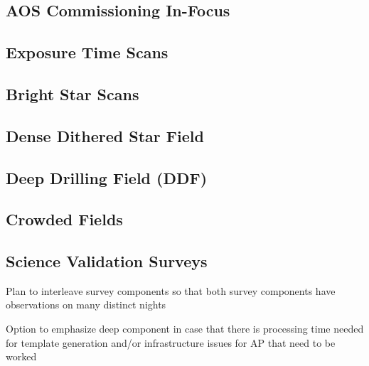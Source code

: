 \documentclass[SE,authoryear,toc,lsstdraft]{lsstdoc}
\begin{document}
\subsection{AOS Commissioning In-Focus}



\subsection{Exposure Time Scans}



\subsection{Bright Star Scans}



\subsection{Dense Dithered Star Field}



\subsection{Deep Drilling Field (DDF)}



\subsection{Crowded Fields}


%

\subsection{Science Validation Surveys}

Plan to interleave survey components so that both survey components have observations on many distinct nights

Option to emphasize deep component in case that there is processing time needed for template generation and/or infrastructure issues for AP that need to be worked
\end{document}
